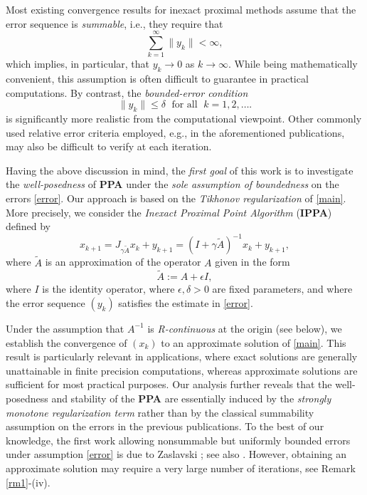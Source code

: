 \documentclass[12pt]{article}
\theoremstyle{plain}
\begin{document}
Most existing convergence results for inexact proximal methods assume that the error sequence is {\it summable}, i.e., they require that
\begin{equation*}
\sum_{k=1}^{\infty}\|y_k\|<\infty,
\end{equation*}
which implies, in particular, that $y_k\to 0$ as $k\to\infty$. While being mathematically convenient, this assumption is often difficult to guarantee in practical computations. By contrast, the {\it bounded-error condition}
\begin{equation}\label{error}
\|y_k\|\leq \delta\;\mbox{ for all }\;k=1,2,\ldots.
\end{equation}
is significantly more realistic from the computational viewpoint. Other commonly used relative error criteria employed, e.g., in  the aforementioned publications, may also be difficult to verify at each iteration.

Having the above {discussion} in mind, the {\it first goal} of this work is to investigate the {\it well-posedness} of \textbf{PPA} under the {{\it sole  assumption of boundedness}} on the errors \eqref{error}. 
Our approach is based on the {\it Tikhonov regularization} of \eqref{main}. More precisely, we consider the {\it Inexact Proximal Point Algorithm} (\textbf{IPPA}) defined by
\begin{equation*}\label{pperrr}
x_{k+1}
=J_{\gamma \widetilde{A}}x_k+y_{k+1}
=(I+\gamma \widetilde{A})^{-1}x_k+y_{k+1},
\end{equation*}
where $\widetilde{A}$ is an approximation of the operator $A$ given in the form
\[
\widetilde{A}:=A+\epsilon I,
\]
where $I$ is the identity operator, where $\epsilon,\delta>0$ are fixed parameters, and where the error sequence $(y_k)$ satisfies the estimate in \eqref{error}.

Under the assumption that $A^{-1}$ is {\it R-continuous} at the origin (see below), we establish the convergence of $(x_k)$ to an approximate solution of \eqref{main}. This result is particularly relevant in applications, where exact solutions are generally unattainable in finite precision computations, whereas approximate solutions are sufficient for most practical purposes. Our analysis further reveals that the well-posedness and stability of the \textbf{PPA} are essentially induced by the {\it strongly monotone regularization term} rather than by the classical summability assumption on the errors in the previous publications. {To the best of our knowledge, the first work allowing nonsummable but uniformly bounded errors under assumption \eqref{error} is due to  Zaslavski \cite{zas10}; see also \cite{zas12,zas20}. However, obtaining an approximate solution may require a very large number of iterations, see Remark \ref{rm1}-(iv).}
\end{document}
